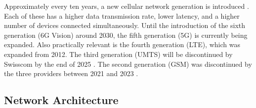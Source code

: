 \begin{English}
    Approximately every ten years, a new cellular network generation is introduced \cite{bundesratNachhaltigesMobilfunknetzBericht2022}. Each of these has a higher data transmission rate, lower latency, and a higher number of devices connected simultaneously. Until the introduction of the sixth generation (6G Vision) around 2030, the fifth generation (5G) is currently being expanded. Also practically relevant is the fourth generation (LTE), which was expanded from 2012. The third generation (UMTS) will be discontinued by Swisscom by the end of 2025 \cite{swisscomAbschaltung3GErneuerung}. The second generation (GSM) was discontinued by the three providers between 2021 and 2023 \cite{onlineSchweizEndgueltigesAus2022}.
\end{English}

\subsection{Network Architecture}


